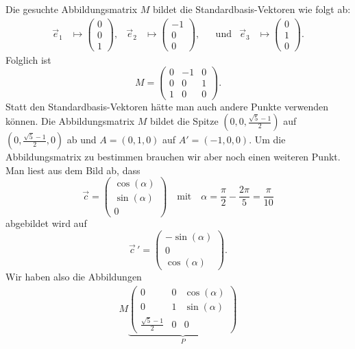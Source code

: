 \begin{loesung}
\begin{teilaufgaben}
\item Die gesuchte Abbildungsmatrix $M$ bildet die Standardbasis-Vektoren wie folgt ab:
\[
\begin{aligned}
\vec e_1&\mapsto \begin{pmatrix}0\\0\\1\end{pmatrix},
&
\vec e_2&\mapsto \begin{pmatrix}-1\\0\\0\end{pmatrix},
&&\text{und}
&
\vec e_3&\mapsto \begin{pmatrix}0\\1\\0\end{pmatrix}.
\end{aligned}
\]
Folglich ist
\[
M
=
\begin{pmatrix}
0 & -1 & 0\\
0 & 0 & 1\\
1 & 0 & 0
\end{pmatrix}.
\]
Statt den Standardbasis-Vektoren hätte man auch andere Punkte verwenden können.
Die Abbildungsmatrix $M$ bildet die Spitze $\left(0,0,\frac{\sqrt{5}-1}{2}\right)$ auf 
$\left(0,\frac{\sqrt{5}-1}{2},0\right)$ ab und $A = (0,1,0)$ auf $A'=(-1,0,0)$.
Um die Abbildungsmatrix zu bestimmen brauchen wir aber noch einen 
weiteren Punkt. Man liest aus dem Bild ab, dass 
\[
  \vec c = \begin{pmatrix}\cos(\alpha)\\ \sin(\alpha)\\0 \end{pmatrix}
  \quad\text{mit}\quad \alpha = \dfrac{\pi}{2}-\dfrac{2\pi}{5} = \dfrac{\pi}{10}
\]
abgebildet wird auf 
\[
  \vec c\,' = \begin{pmatrix}-\sin(\alpha)\\ 0\\\cos(\alpha) \end{pmatrix}.
\]
Wir haben also die Abbildungen
\[
\begin{aligned}
M
\underbrace{\begin{pmatrix}
0 & 0 &\cos(\alpha)\\
0 & 1 & \sin(\alpha)\\
\frac{\sqrt{5}-1}{2} &0 & 0
\end{pmatrix}}_{\displaystyle P}

\end{aligned}\]
\end{teilaufgaben}
\end{loesung}
